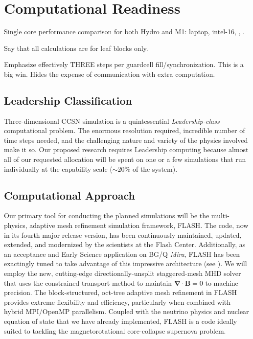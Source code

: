 \section{Computational Readiness}

Single core performance comparison for both Hydro and M1: laptop, intel-16, \mira, \thet.

Say that all calculations are for leaf blocks only.

Emphasize effectively THREE steps per guardcell fill/synchronization. This is a big win. Hides the expense of communication with extra computation.

\subsection{Leadership Classification}
Three-dimensional CCSN simulation is a quintessential {\it
  Leadership-class} computational problem. The enormous resolution
required, incredible number of time steps needed, and the challenging
nature and variety of the physics involved make it so. Our proposed
research requires Leadership computing because almost all of our requested allocation
will be spent on one or a few simulations that run individually at the
capability-scale ($\sim20\%$ of the system).

\subsection{Computational Approach}
\label{sec:approach}

Our primary tool for conducting the planned simulations will be the multi-physics, adaptive mesh refinement simulation framework, FLASH.
The code, now in its fourth major release version, has been continuously maintained, updated, extended, and modernized by the scientists at the Flash Center.
Additionally, as an acceptance and Early Science application on BG/Q {\it Mira}, FLASH has been exactingly tuned to take advantage of this impressive architecture (see \citet{Daley:2013esp}).
We will employ the new, cutting-edge directionally-unsplit staggered-mesh MHD solver \citep{Lee:2013cd} that uses the constrained transport method to maintain $\pmb{\nabla \cdot B} = 0$ to machine precision.
The block-structured, oct-tree adaptive mesh refinement in FLASH provides extreme flexibility and efficiency, particularly when combined with hybrid MPI/OpenMP parallelism.
Coupled with the neutrino physics and nuclear equation of state that we have already implemented, FLASH is a code ideally suited to tackling the magnetorotational core-collapse supernova problem.

